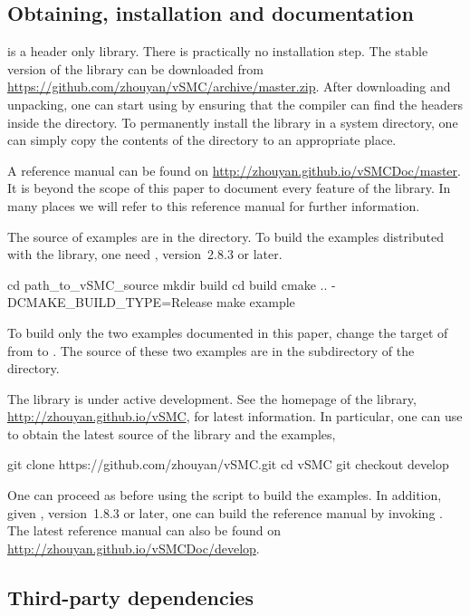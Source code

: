\documentclass[11pt, bib, hyper, mint, minted=cache]{marticle}
\begin{document}
\subsection{Obtaining, installation and documentation}

\vsmc is a header only library. There is practically no installation step. The
stable version of the library can be downloaded from
\url{https://github.com/zhouyan/vSMC/archive/master.zip}. After downloading
and unpacking, one can start using \vsmc by ensuring that the compiler can
find the headers inside the  directory. To permanently
install the library in a system directory, one can simply copy the contents of
the  directory to an appropriate place.

A reference manual can be found on
\url{http://zhouyan.github.io/vSMCDoc/master}. It is beyond the scope of this
paper to document every feature of the library. In many places we will refer
to this reference manual for further information.

The source of examples are in the  directory. To build
the examples distributed with the library, one need \fcmake, version~2.8.3 or
later.
\begin{shcode}
cd path_to_vSMC_source
mkdir build
cd build
cmake .. -DCMAKE_BUILD_TYPE=Release
make example
\end{shcode}
To build only the two examples documented in this paper, change the target of
 from  to . The source of
these two examples are in the  subdirectory of the
 directory.

The library is under active development. See the homepage of the library,
\url{http://zhouyan.github.io/vSMC}, for latest information. In particular,
one can use \lgit to obtain the latest source of the library and the examples,
\begin{shcode}
git clone https://github.com/zhouyan/vSMC.git
cd vSMC
git checkout develop
\end{shcode}
One can proceed as before using the \lcmake script to build the examples. In
addition, given \fdoxygen, version~1.8.3 or later, one can build the reference
manual by invoking . The latest reference manual can also
be found on \url{http://zhouyan.github.io/vSMCDoc/develop}.

\subsection{Third-party dependencies}
\end{document}
